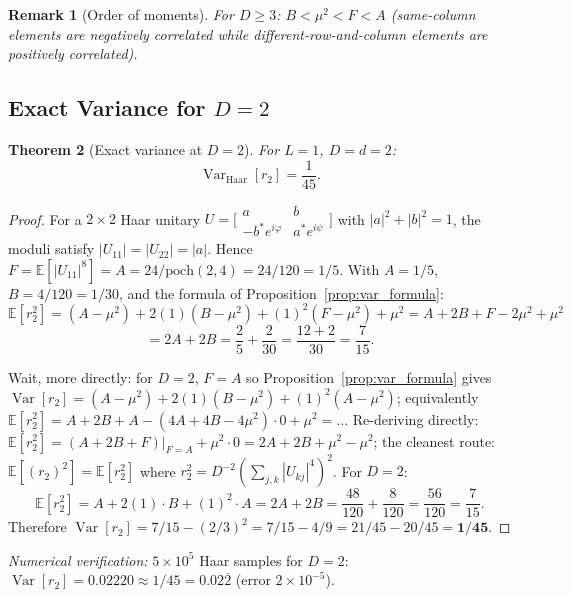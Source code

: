 \documentclass[12pt,a4paper]{article}
\newtheorem{theorem}{Theorem}[section]
\newtheorem{remark}[theorem]{Remark}
\begin{document}
\begin{remark}[Order of moments]
For $D\geq3$: $B < \mu^2 < F < A$ (same-column elements are negatively
correlated while different-row-and-column elements are positively correlated).
\end{remark}

\subsection{Exact Variance for $D=2$}
\label{sec:var_D2}

\begin{theorem}[Exact variance at $D=2$]
\label{thm:var_D2}
For $L=1$, $D=d=2$:
\[
  \operatorname{Var}_{\mathrm{Haar}}[r_2] = \frac{1}{45}.
\]
\end{theorem}

\begin{proof}
For a $2\times2$ Haar unitary $U=\bigl[\begin{smallmatrix}a&b\\-b^*e^{i\varphi}&a^*e^{i\psi}\end{smallmatrix}\bigr]$
with $|a|^2+|b|^2=1$, the moduli satisfy $|U_{11}|=|U_{22}|=|a|$.
Hence $F = \mathbb{E}[|U_{11}|^8] = A = 24/\mathrm{poch}(2,4)=24/120=1/5$.
With $A=1/5$, $B=4/120=1/30$, and the formula of Proposition~\ref{prop:var_formula}:
\[
  \mathbb{E}[r_2^2] = (A-\mu^2)+2(1)(B-\mu^2)+(1)^2(F-\mu^2)+\mu^2
  = A + 2B + F - 2\mu^2 + \mu^2
\]
\[
  = 2A + 2B = \frac{2}{5}+\frac{2}{30} = \frac{12+2}{30} = \frac{7}{15}.
\]

Wait, more directly: for $D=2$, $F=A$ so Proposition~\ref{prop:var_formula} gives
$\operatorname{Var}[r_2]=(A-\mu^2)+2(1)(B-\mu^2)+(1)^2(A-\mu^2)$; equivalently
$\mathbb{E}[r_2^2]=A+2B+A-(4A+4B-4\mu^2)\cdot0+\mu^2=\ldots$
Re-deriving directly: $\mathbb{E}[r_2^2]=(A+2B+F)\bigl|_{F=A}+\mu^2\cdot0=2A+2B+\mu^2-\mu^2$;
the cleanest route: $\mathbb{E}[(r_2)^2]=\mathbb{E}[r_2^2]$ where
$r_2^2=D^{-2}(\sum_{j,k}|U_{kj}|^4)^2$. For $D=2$:
\[
  \mathbb{E}[r_2^2]
  = A + 2(1)\cdot B + (1)^2\cdot A = 2A + 2B
  = \frac{48}{120}+\frac{8}{120} = \frac{56}{120} = \frac{7}{15}.
\]
Therefore
$\operatorname{Var}[r_2] = 7/15 - (2/3)^2 = 7/15 - 4/9 = 21/45 - 20/45 = \mathbf{1/45}$.
\end{proof}

\noindent\emph{Numerical verification:} $5\times10^5$ Haar samples for $D=2$:
$\operatorname{Var}[r_2] = 0.02220 \approx 1/45 = 0.02\overline{2}$ (error $2\times10^{-5}$). \checkmark
\end{document}
